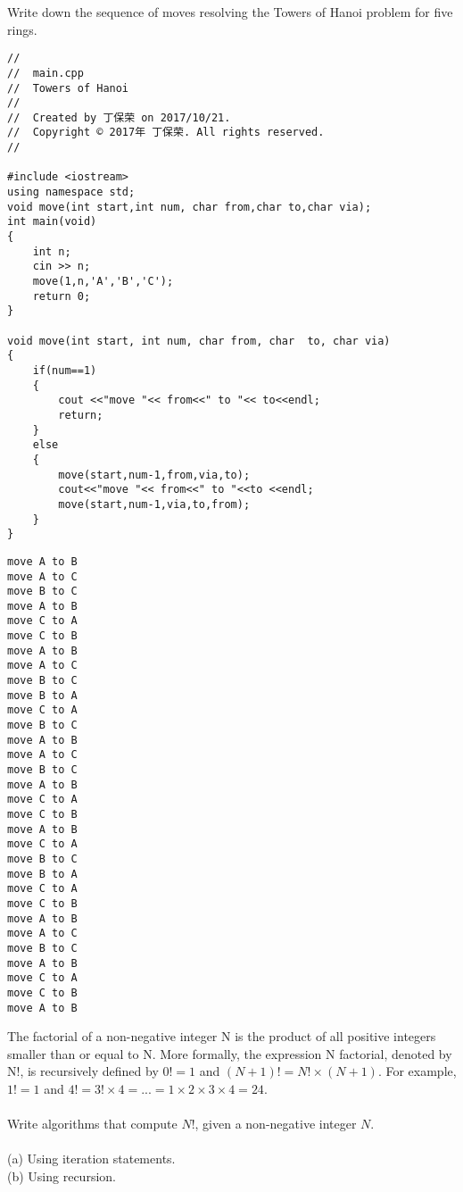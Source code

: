 \documentclass[11pt, a4paper, UTF8]{ctexart}
\begin{document}
\begin{problem}[DH: 2.6]
Write down the sequence of moves resolving the Towers of Hanoi problem for five rings.\\
\end{problem}

\begin{solution}
\begin{lstlisting}
//
//  main.cpp
//  Towers of Hanoi
//
//  Created by 丁保荣 on 2017/10/21.
//  Copyright © 2017年 丁保荣. All rights reserved.
//

#include <iostream>
using namespace std;
void move(int start,int num, char from,char to,char via);
int main(void)
{
    int n;
    cin >> n;
    move(1,n,'A','B','C');
    return 0;
}

void move(int start, int num, char from, char  to, char via)
{
    if(num==1)
    {
        cout <<"move "<< from<<" to "<< to<<endl;
        return;
    }
    else
    {
        move(start,num-1,from,via,to);
        cout<<"move "<< from<<" to "<<to <<endl;
        move(start,num-1,via,to,from);
    }
}
\end{lstlisting}
\begin{verbatim}
move A to B
move A to C
move B to C
move A to B
move C to A
move C to B
move A to B
move A to C
move B to C
move B to A
move C to A
move B to C
move A to B
move A to C
move B to C
move A to B
move C to A
move C to B
move A to B
move C to A
move B to C
move B to A
move C to A
move C to B
move A to B
move A to C
move B to C
move A to B
move C to A
move C to B
move A to B
\end{verbatim}
\end{solution}
\begin{problem}[DH: 2.7]
The factorial of a non-negative integer N is the product of all positive integers smaller than or equal to N. More formally, the expression N factorial, denoted by N!, is recursively defined by \(0! = 1\) and \((N + 1)! = N! × (N + 1)\). For example, \(1! = 1\) and \(4! = 3! × 4 = . . . = 1 × 2 × 3 × 4 = 24\).\\
\\
Write algorithms that compute \(N!\), given a non-negative integer \(N\).\\
\\
(a) Using iteration statements.\\
(b) Using recursion.
\end{problem}

\end{document}
